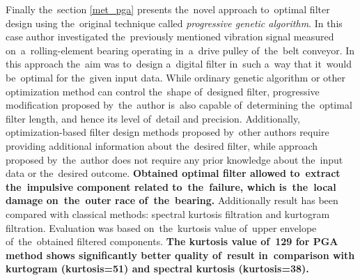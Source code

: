 Finally the~section \ref{met_pga} presents the~novel approach to~optimal filter design using the~original technique called \emph{progressive genetic algorithm}. In this case author investigated the~previously mentioned vibration signal measured on~a~rolling-element bearing operating in~a~drive pulley of~the~belt conveyor. In this approach the~aim was to~design a~digital filter in~such a~way that it~would be~optimal for the~given input data. While ordinary genetic algorithm or other optimization method can control the~shape of~designed filter, progressive modification proposed by~the~author is~also capable of~determining the~optimal filter length, and hence its level of~detail and precision. Additionally, optimization-based filter design methods proposed by~other authors require providing additional information about the~desired filter, while approach proposed by~the~author does not require any prior knowledge about the~input data or the~desired outcome. \textbf{Obtained optimal filter allowed to~extract the~impulsive component related to~the~failure, which is~the~local damage on~the~outer race of~the~bearing.} Additionally result has been compared with classical methods: spectral kurtosis filtration and kurtogram filtration. Evaluation was based on~the~kurtosis value of~upper envelope of~the~obtained filtered components. \textbf{The kurtosis value of~129 for PGA method shows significantly better quality of~result in~comparison with kurtogram (kurtosis=51) and spectral kurtosis (kurtosis=38).}


